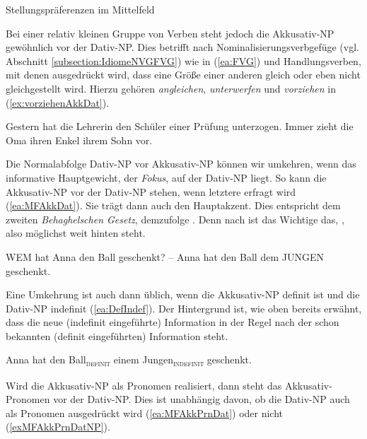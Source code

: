 \begin{Exkurs}{Stellungspräferenzen im Mittelfeld}
\ea \label{ea:Dat-NPvorAkk-NP}
\label{ea:Dat_AKK}
\label{ex:DAT_Akk}
\label{ex:Akk_DAT}
\label{ex:AKK_Dat}
\z 
\z 

Bei einer relativ kleinen Gruppe von Verben steht jedoch die Akkusativ-NP gewöhnlich vor der Dativ-NP. Dies betrifft nach \citet[134--135]{Wegener1995} Nominalisierungsverbgefüge (vgl. Abschnitt \ref{subsection:IdiomeNVGFVG}) wie in (\ref{ea:FVG}) und Handlungsverben, mit denen ausgedrückt wird, dass eine Größe einer anderen gleich oder eben nicht gleichgestellt wird. Hierzu gehören \zB \textit{angleichen}, \textit{unterwerfen} und \textit{vorziehen} in (\ref{ex:vorziehenAkkDat}).

\ea \label{ea:Akk-NPvorDat-NP}
\ea \label{ea:FVG} Gestern hat die Lehrerin den Schüler einer Prüfung unterzogen.
\ex \label{ex:vorziehenAkkDat} Immer zieht die Oma ihren Enkel ihrem Sohn vor.
\z 
\z 

Die Normalabfolge Dativ-NP vor Akkusativ-NP können wir umkehren, wenn das informative Hauptgewicht, der \textit{Fokus}, auf der Dativ-NP liegt. So kann die Akkusativ-NP vor der Dativ-NP stehen, wenn letztere erfragt wird (\ref{ea:MFAkkDat}). Sie trägt dann auch den Hauptakzent. Dies entspricht dem zweiten \textit{Behaghelschen Gesetz}, demzufolge . Denn nach \citet[4]{Behaghel1932SyntaxStellung} ist das Wichtige das, , also möglichst weit hinten steht. 

\ea \label{ea:MFAkkDat} WEM hat Anna den Ball geschenkt? -- Anna hat den Ball dem JUNGEN geschenkt.
\z 

Eine Umkehrung ist auch dann üblich, wenn die Akkusativ-NP definit ist und die Dativ-NP indefinit (\ref{ea:DefIndef}). Der Hintergrund ist, wie oben bereits erwähnt, dass die neue (indefinit eingeführte) Information in der Regel nach der schon bekannten (definit eingeführten) Information steht.

\ea \label{ea:DefIndef} Anna hat den Ball\textsubscript{\textsc{definit}} einem Jungen\textsubscript{\textsc{indefinit}} geschenkt.
\z 

Wird die Akkusativ-NP als Pronomen realisiert, dann steht das Akkusativ-Pronomen vor der Dativ-NP. Dies ist unabhängig davon, ob die Dativ-NP auch als Pronomen ausgedrückt wird (\ref{ea:MFAkkPrnDat}) oder nicht (\ref{exMFAkkPrnDatNP}). 


\end{Exkurs}
